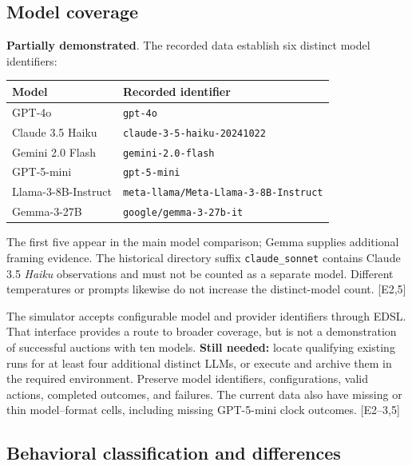 \documentclass[11pt,letterpaper]{article}
\newcommand{\partiallydemonstrated}{\textcolor{conditional}{\textbf{Partially demonstrated}}}
\newcommand{\evidence}[1]{\textnormal{[E#1]}}
\begin{document}
\subsection{Model coverage}

\partiallydemonstrated. The recorded data establish six distinct model identifiers:

\begin{center}
\small
\begin{tabular}{@{}ll@{}}
\toprule
Model & Recorded identifier \\
\midrule
GPT-4o & \texttt{gpt-4o} \\
Claude 3.5 Haiku & \texttt{claude-3-5-haiku-20241022} \\
Gemini 2.0 Flash & \texttt{gemini-2.0-flash} \\
GPT-5-mini & \texttt{gpt-5-mini} \\
Llama-3-8B-Instruct & \texttt{meta-llama/Meta-Llama-3-8B-Instruct} \\
Gemma-3-27B & \texttt{google/gemma-3-27b-it} \\
\bottomrule
\end{tabular}
\end{center}

The first five appear in the main model comparison; Gemma supplies additional
framing evidence. The historical directory suffix \texttt{claude\_sonnet}
contains Claude 3.5 \emph{Haiku} observations and must not be counted as a
separate model. Different temperatures or prompts likewise do not increase
the distinct-model count. \evidence{2,5}

The simulator accepts configurable model and provider identifiers through
EDSL. That interface provides a route to broader coverage, but is not a
demonstration of successful auctions with ten models. \textbf{Still needed:}
locate qualifying existing runs for at least four additional distinct LLMs,
or execute and archive them in the required environment. Preserve model
identifiers, configurations, valid actions, completed outcomes, and failures.
The current data also have missing or thin model--format cells, including
missing GPT-5-mini clock outcomes. \evidence{2--3,5}

\subsection{Behavioral classification and differences}
\end{document}
